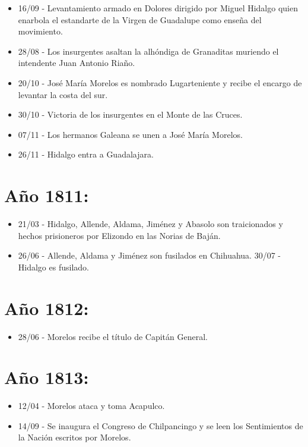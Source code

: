 \begin{itemize}
\item 16/09 - Levantamiento armado en Dolores dirigido por Miguel Hidalgo quien enarbola el estandarte de la Virgen de Guadalupe como enseña del movimiento.
\item 28/08 - Los insurgentes asaltan la alhóndiga de Granaditas muriendo el intendente Juan Antonio Riaño.
\item 20/10 - José María Morelos es nombrado Lugarteniente y recibe el encargo de levantar la costa del sur.
\item 30/10 - Victoria de los insurgentes en el Monte de las Cruces.
\item 07/11 - Los hermanos Galeana se unen a José María Morelos.
\item 26/11 - Hidalgo entra a Guadalajara.
\end{itemize}

\section*{Año 1811:}

\begin{itemize}
\item 21/03 - Hidalgo, Allende, Aldama, Jiménez y Abasolo son traicionados y hechos prisioneros por Elizondo en las Norias de Baján.
\item 26/06 - Allende, Aldama y Jiménez son fusilados en Chihuahua.
30/07 - Hidalgo es fusilado.
\end{itemize}

\section*{Año 1812:}

\begin{itemize}
\item 28/06 - Morelos recibe el título de Capitán General.
\end{itemize}

\section*{Año 1813:}

\begin{itemize}
\item 12/04 - Morelos ataca y toma Acapulco.
\item 14/09 - Se inaugura el Congreso de Chilpancingo y se leen los Sentimientos de la Nación escritos por Morelos.
\end{itemize}


